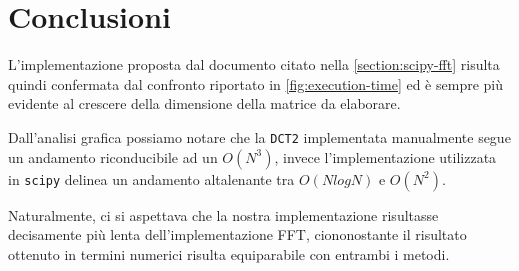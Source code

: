 \documentclass[11pt,italian]{article}
\begin{document}
\newpage
\section{Conclusioni}
L'implementazione proposta dal documento citato nella \cref{section:scipy-fft} risulta quindi confermata dal confronto riportato in \cref{fig:execution-time} ed è sempre più evidente al crescere della dimensione della matrice da elaborare.

Dall'analisi grafica possiamo notare che la \lstinline{DCT2} implementata manualmente segue un andamento riconducibile ad un $O(N^3)$, invece l'implementazione utilizzata in \lstinline{scipy} delinea un andamento altalenante tra $O(NlogN)$ e $O(N^2)$.

Naturalmente, ci si aspettava che la nostra implementazione risultasse decisamente più lenta dell'implementazione FFT, ciononostante il risultato ottenuto in termini numerici risulta equiparabile con entrambi i metodi.
\end{document}
